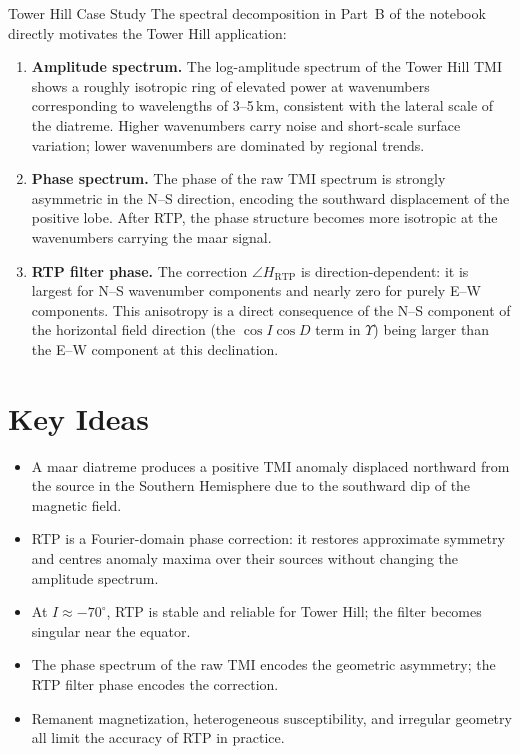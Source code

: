 \begin{activity}{Tower Hill Case Study}
The spectral decomposition in Part~B of the notebook directly motivates
the Tower Hill application:

\begin{enumerate}
  \item \textbf{Amplitude spectrum.}
        The log-amplitude spectrum of the Tower Hill TMI shows a roughly
        isotropic ring of elevated power at wavenumbers corresponding to
        wavelengths of 3--5\,km, consistent with the lateral scale of the
        diatreme.
        Higher wavenumbers carry noise and short-scale surface variation;
        lower wavenumbers are dominated by regional trends.

  \item \textbf{Phase spectrum.}
        The phase of the raw TMI spectrum is strongly asymmetric in the
        N--S direction, encoding the southward displacement of the positive
        lobe.
        After RTP, the phase structure becomes more isotropic at the
        wavenumbers carrying the maar signal.

  \item \textbf{RTP filter phase.}
        The correction $\angle H_\text{RTP}$ is direction-dependent:
        it is largest for N--S wavenumber components and nearly zero
        for purely E--W components.
        This anisotropy is a direct consequence of the N--S component
        of the horizontal field direction (the $\cos I\cos D$ term in
        $\Upsilon$) being larger than the E--W component at this declination.
\end{enumerate}

\section{Key Ideas}

\begin{itemize}
  \item A maar diatreme produces a positive TMI anomaly displaced northward
        from the source in the Southern Hemisphere due to the southward dip
        of the magnetic field.
  \item RTP is a Fourier-domain phase correction: it restores approximate
        symmetry and centres anomaly maxima over their sources without
        changing the amplitude spectrum.
  \item At $I \approx -70^\circ$, RTP is stable and reliable for Tower Hill;
        the filter becomes singular near the equator.
  \item The phase spectrum of the raw TMI encodes the geometric asymmetry;
        the RTP filter phase encodes the correction.
  \item Remanent magnetization, heterogeneous susceptibility, and
        irregular geometry all limit the accuracy of RTP in practice.
\end{itemize}

\end{activity}
